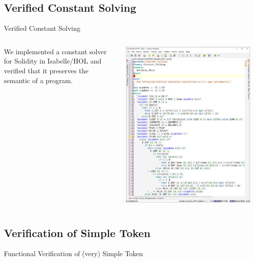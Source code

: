 \documentclass[aspectratio=169]{beamer}
\begin{document}
\subsection{Verified Constant Solving}
\begin{frame}{Verified Constant Solving}
\begin{columns}


\bigskip\pause

\begin{center}
We implemented a constant solver for Solidity in Isabelle/HOL and verified that it preserves the semantic of a program.
\end{center}

\includegraphics[width=\columnwidth]{isacs}
\end{columns}
\end{frame}

\subsection{Verification of Simple Token}
\begin{frame}{Functional Verification of (very) Simple Token}

\end{frame}
\end{document}
